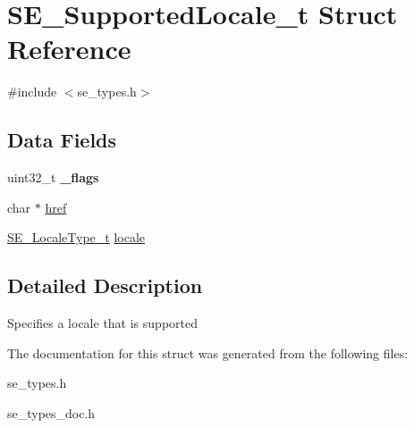 \hypertarget{structSE__SupportedLocale__t}{}\section{S\+E\+\_\+\+Supported\+Locale\+\_\+t Struct Reference}
\label{structSE__SupportedLocale__t}


{\ttfamily \#include $<$se\+\_\+types.\+h$>$}

\subsection*{Data Fields}
\begin{DoxyCompactItemize}
\item 
uint32\+\_\+t {\bfseries \+\_\+flags}
\item 
char $\ast$ \hyperlink{group__SupportedLocale_ga4dceab07e3e7dc69ca2393ffea2dc145}{href}
\item 
\hyperlink{group__LocaleType_gafbd2b639ff2cebd36ad75759203ee20c}{S\+E\+\_\+\+Locale\+Type\+\_\+t} \hyperlink{group__SupportedLocale_ga1fc9258fccc19fa907b3d8cd28b26465}{locale}
\end{DoxyCompactItemize}


\subsection{Detailed Description}
Specifies a locale that is supported 

The documentation for this struct was generated from the following files\+:\begin{DoxyCompactItemize}
\item 
se\+\_\+types.\+h\item 
se\+\_\+types\+\_\+doc.\+h\end{DoxyCompactItemize}
